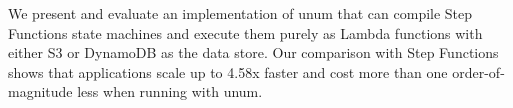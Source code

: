 \documentclass[letterpaper,twocolumn,10pt]{article}
\newcommand{\name}{unum}
\begin{document}
We present and evaluate an implementation of \name{} that can compile Step
Functions state machines and execute them purely as Lambda functions with
either S3 or DynamoDB as the data store. Our comparison with Step Functions
shows that applications scale up to 4.58x faster and cost more than one
order-of-magnitude less when running with \name{}. 




%


% 


\vspace{5in} %




\end{document}

